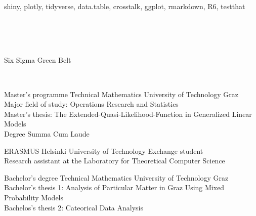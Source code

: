 \documentclass{yalcv}
\begin{document}
\begin{cvsidebar}
    \begin{cvsidebarbox}
        shiny, plotly, tidyverse, data.table, crosstalk, ggplot, rmarkdown, R6, testthat
    \end{cvsidebarbox}

    \begin{cvsidebarbox}
        \\
    \end{cvsidebarbox}

    \begin{cvsidebarbox}
        \\
        \\
        \scalebox{1.5}{\(\bm\sigma\)}\cviconskip%
        Six Sigma Green Belt
    \end{cvsidebarbox}

    \begin{cvsidebarbox}
        \\
    \end{cvsidebarbox}

    \begin{cvsidebarbox}
        \Large{%
            \quad{}\quad{}%
        }
    \end{cvsidebarbox}
\end{cvsidebar}%
\begin{cvbody}
    {Master’s programme Technical Mathematics}
    {University of Technology Graz}
    {Major field of study: Operations Research and Statistics\\
        Master's thesis: The Extended-Quasi-Likelihood-Function in Generalized Linear Models\\
        Degree Summa Cum Laude}

    {ERASMUS}
    {Helsinki University of Technology}
    {Exchange student\\
        Research assistant at the Laboratory for Theoretical Computer Science}

    {Bachelor’s degree Technical Mathematics}
    {University of Technology Graz}
    {Bachelor's thesis 1: Analysis of Particular Matter in Graz Using Mixed Probability Models\\
        Bachelos's thesis 2: Cateorical Data Analysis}
\end{cvbody}
\end{document}
